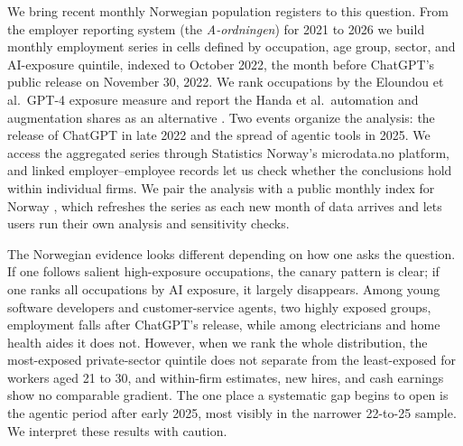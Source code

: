 \documentclass[12pt]{article}
\begin{document}
We bring recent monthly Norwegian population registers to this question. From the employer reporting system (the \emph{A-ordningen}) for 2021 to 2026 we build monthly employment series in cells defined by occupation, age group, sector, and AI-exposure quintile, indexed to October 2022, the month before ChatGPT's public release on November 30, 2022. We rank occupations by the Eloundou et al.\ GPT-4 exposure measure \citep{eloundou2024} and report the Handa et al.\ automation and augmentation shares as an alternative \citep{handa2025}. Two events organize the analysis: the release of ChatGPT in late 2022 and the spread of agentic tools in 2025. We access the aggregated series through Statistics Norway's microdata.no platform, and linked employer--employee records let us check whether the conclusions hold within individual firms. We pair the analysis with a public monthly index for Norway \citep{kiindeksen2026}, which refreshes the series as each new month of data arrives and lets users run their own analysis and sensitivity checks.

The Norwegian evidence looks different depending on how one asks the question. If one follows salient high-exposure occupations, the canary pattern is clear; if one ranks all occupations by AI exposure, it largely disappears. Among young software developers and customer-service agents, two highly exposed groups, employment falls after ChatGPT's release, while among electricians and home health aides it does not. However, when we rank the whole distribution, the most-exposed private-sector quintile does not separate from the least-exposed for workers aged 21 to 30, and within-firm estimates, new hires, and cash earnings show no comparable gradient. The one place a systematic gap begins to open is the agentic period after early 2025, most visibly in the narrower 22-to-25 sample. We interpret these results with caution.
\end{document}
